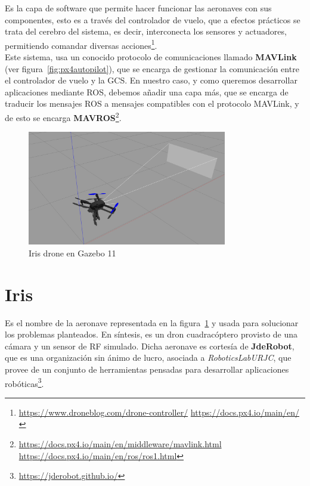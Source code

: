 Es la capa de software que permite hacer funcionar las aeronaves con sus componentes, esto es a través del controlador de vuelo, que a efectos prácticos se trata del cerebro del sistema, es decir, interconecta los sensores y actuadores, permitiendo comandar diversas acciones\footnote[14]{\url{https://www.droneblog.com/drone-controller/} \url{https://docs.px4.io/main/en/}}.\\

Este sistema, usa un conocido protocolo de comunicaciones llamado \textbf{MAVLink} (ver figura~\ref{fig:px4autopilot}), que se encarga de gestionar la comunicación entre el controlador de vuelo y la \ac{GCS}. En nuestro caso, y como queremos desarrollar aplicaciones mediante \ac{ROS}, debemos añadir una capa más, que se encarga de traducir los mensajes ROS a mensajes compatibles con el protocolo MAVLink, y de esto se encarga \textbf{MAVROS}\footnote[15]{\url{https://docs.px4.io/main/en/middleware/mavlink.html} \url{https://docs.px4.io/main/en/ros/ros1.html}}.\\

\begin{figure} [tp]
	\begin{center}
	\includegraphics[height=5cm]{imagenes/cap3/8_iris_drone.png}
	\end{center}
	\caption[Iris drone en Gazebo 11]{Iris drone en Gazebo 11}
	\label{fig:irisdrone}
\end{figure}

\section{Iris}
\label{sec:iris}

Es el nombre de la aeronave representada en la figura~\ref{fig:irisdrone} y usada para solucionar los problemas planteados. En síntesis, es un dron cuadracóptero provisto de una cámara y un sensor de \ac{RF} simulado. Dicha aeronave es cortesía de \textbf{JdeRobot}, que es una organización sin ánimo de lucro, asociada a \emph{RoboticsLabURJC}, que provee de un conjunto de herramientas pensadas para desarrollar aplicaciones robóticas\footnote[16]{\url{https://jderobot.github.io/}}.\\